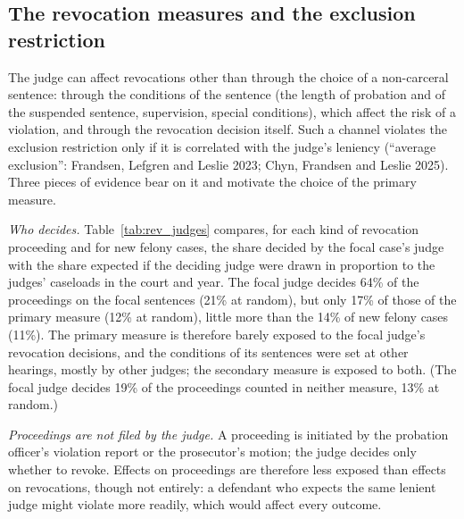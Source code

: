 \documentclass[11pt]{article}
\begin{document}
\subsection{The revocation measures and the exclusion restriction}\label{sec:exclusion}

The judge can affect revocations other than through the choice of a non-carceral sentence: through the conditions of the sentence (the length of probation and of the suspended sentence, supervision, special conditions), which affect the risk of a violation, and through the revocation decision itself. Such a channel violates the exclusion restriction only if it is correlated with the judge's leniency (``average exclusion'': Frandsen, Lefgren and Leslie 2023; Chyn, Frandsen and Leslie 2025). Three pieces of evidence bear on it and motivate the choice of the primary measure.

\emph{Who decides.} Table~\ref{tab:rev_judges} compares, for each kind of revocation proceeding and for new felony cases, the share decided by the focal case's judge with the share expected if the deciding judge were drawn in proportion to the judges' caseloads in the court and year. The focal judge decides 64\% of the proceedings on the focal sentences (21\% at random), but only 17\% of those of the primary measure (12\% at random), little more than the 14\% of new felony cases (11\%). The primary measure is therefore barely exposed to the focal judge's revocation decisions, and the conditions of its sentences were set at other hearings, mostly by other judges; the secondary measure is exposed to both. (The focal judge decides 19\% of the proceedings counted in neither measure, 13\% at random.)

\emph{Proceedings are not filed by the judge.} A proceeding is initiated by the probation officer's violation report or the prosecutor's motion; the judge decides only whether to revoke. Effects on proceedings are therefore less exposed than effects on revocations, though not entirely: a defendant who expects the same lenient judge might violate more readily, which would affect every outcome.
\end{document}
